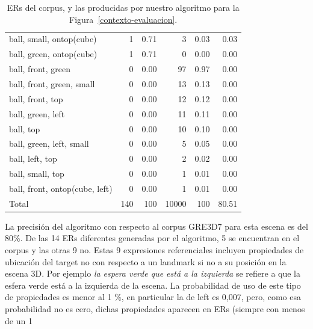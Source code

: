 \begin{table}[H]
\begin{table}[H]
\begin{small}
\begin{center}
\begin{tabular}{|l|r|r|r|r|r|}
ball, small, ontop(cube)                       &  1 &  0.71 &    3 &  0.03 &  0.03 \\
ball, green, ontop(cube)                       &  1 &  0.71 &    0 &  0.00 &  0.00\\
ball, front, green                              &  0 &  0.00 &   97 &  0.97 &  0.00\\
ball, front, green, small                        &  0 &  0.00 &   13 &  0.13 &  0.00\\
ball, front, top                                &  0 &  0.00 &   12 &  0.12 &  0.00\\
ball, green, left	                              &  0 &  0.00 &   11 &  0.11 &  0.00\\
ball, top                                      &  0 &  0.00 &   10 &  0.10 &  0.00\\
ball, green, left, small                         &  0 &  0.00 &    5 &  0.05 &  0.00\\
ball, left, top                                 &  0 &  0.00 &    2 &  0.02 &  0.00\\
ball, small, top                                &  0 &  0.00 &    1 &  0.01 &  0.00\\
ball, front, ontop(cube, left)                  &  0 &  0.00 &    1 &  0.01 &  0.00\\

\hline
Total & 140 & 100 & 10000 & 100 & 80.51 \\
\hline
\end{tabular}
\caption{ERs del corpus, y las producidas por nuestro algoritmo para la Figura~\ref{contexto-evaluacion}.\label{results-algo-fig3}}
\vspace*{-.5cm}
\end{center}
\end{small}
\end{table}

 La precisi\'on del algoritmo con respecto al corpus GRE3D7 para esta escena es del 80\%. De las 14 ERs diferentes generadas por el algoritmo, 5 se encuentran en el corpus y las otras 9 no. Estas 9 expresiones referenciales incluyen propiedades de ubicación del target no con respecto a un landmark si no a su posición en la escena 3D. Por ejemplo \emph{la espera verde que está a la izquierda} se refiere a que la esfera verde está a la izquierda de la escena.  La probabilidad de uso de este tipo de propiedades es menor al 1 \%, en particular la de left es 0,007, pero, como esa probabilidad no es cero, dichas propiedades aparecen en ERs (siempre con menos de un 1%


\end{table}
